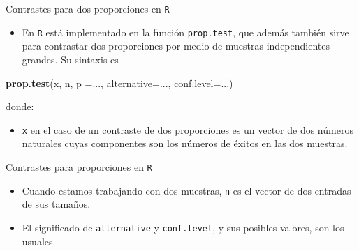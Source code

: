 \documentclass[
  ignorenonframetext,
]{beamer}
\newenvironment{Shaded}{\begin{snugshade}}{\end{snugshade}}
\newcommand{\DataTypeTok}[1]{\textcolor[rgb]{0.13,0.29,0.53}{#1}}
\newcommand{\KeywordTok}[1]{\textcolor[rgb]{0.13,0.29,0.53}{\textbf{#1}}}
\newcommand{\NormalTok}[1]{#1}
\providecommand{\tightlist}{%
  \setlength{\itemsep}{0pt}\setlength{\parskip}{0pt}}
\begin{document}
\begin{frame}[fragile]{Contrastes para dos proporciones en \texttt{R}}
\protect\hypertarget{contrastes-para-dos-proporciones-en-r}{}
\begin{itemize}[<+->]
\tightlist
\item
  En \texttt{R} está implementado en la función \texttt{prop.test}, que
  además también sirve para contrastar dos proporciones por medio de
  muestras independientes grandes. Su sintaxis es
\end{itemize}

\begin{Shaded}
\begin{Highlighting}[]
\KeywordTok{prop.test}\NormalTok{(x, n, }\DataTypeTok{p =}\NormalTok{..., }\DataTypeTok{alternative=}\NormalTok{..., }\DataTypeTok{conf.level=}\NormalTok{...)}
\end{Highlighting}
\end{Shaded}

donde:

\begin{itemize}[<+->]
\tightlist
\item
  \texttt{x} en el caso de un contraste de dos proporciones es un vector
  de dos números naturales cuyas componentes son los números de éxitos
  en las dos muestras.
\end{itemize}
\end{frame}

\begin{frame}[fragile]{Contrastes para proporciones en \texttt{R}}
\protect\hypertarget{contrastes-para-proporciones-en-r-1}{}
\begin{itemize}[<+->]
\item
  Cuando estamos trabajando con dos muestras, \texttt{n} es el vector de
  dos entradas de sus tamaños.
\item
  El significado de \texttt{alternative} y \texttt{conf.level}, y sus
  posibles valores, son los usuales.
\end{itemize}
\end{frame}
\end{document}
